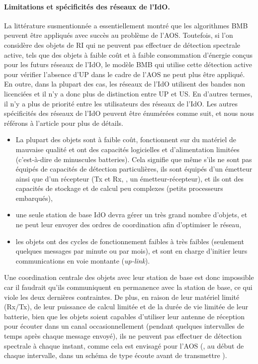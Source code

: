 \begin{resume_fr}
\paragraph{Limitations et spécificités des réseaux de l'IdO.}
%
La littérature susmentionnée a essentiellement montré que les algorithmes BMB peuvent être appliqués avec succès au problème de l'AOS.
Toutefois, si l'on considère des objets de RI qui ne peuvent pas effectuer de détection spectrale active, tels que des objets à faible coût et à faible consommation d'énergie conçus pour les futurs réseaux de l'IdO, le modèle BMB qui utilise cette détection active pour vérifier l'absence d'UP dans le cadre de l'AOS ne peut plus être appliqué.
En outre, dans la plupart des cas, les réseaux de l'IdO utilisent des bandes non licenciées et il n'y a donc plus de distinction entre UP et US.
En d'autres termes, il n'y a plus de priorité entre les utilisateurs des réseaux de l'IdO.
%
Les autres spécificités des réseaux de l'IdO peuvent être énumérées comme suit,
et nous nous référons à l'article \cite{Centenaro16} pour plus de détails.
%
\begin{itemize}\tightlist
    \item
    La plupart des objets sont à faible coût, fonctionnent sur du matériel de mauvaise qualité et ont des capacités logicielles et d'alimentation limitées (c'est-à-dire de minuscules batteries).
    Cela signifie que même s'ils ne sont pas équipés de capacités de détection particulières,
    ils sont équipés d'un émetteur ainsi que d'un récepteur (Tx et Rx, \ie, un émetteur-récepteur),
    et ils ont des capacités de stockage et de calcul peu complexes (petits processeurs embarqués),
    \item
    une seule station de base IdO devra gérer un très grand nombre d'objets,
    et ne peut leur envoyer des ordres de coordination afin d'optimiser le réseau,
    \item
    les objets ont des cycles de fonctionnement faibles à très faibles (seulement quelques messages par minute ou par mois), et sont en charge d'initier leurs communications en voie montante (\emph{up-link}).
\end{itemize}

Une coordination centrale des objets avec leur station de base est donc impossible car il faudrait qu'ils communiquent en permanence avec la station de base, ce qui viole les deux dernières contraintes.
%
De plus, en raison de leur matériel limité (Rx/Tx), de leur puissance de calcul limitée et de la durée de vie limitée de leur batterie, bien que les objets soient capables d'utiliser leur antenne de réception pour écouter dans un canal occasionnellement (pendant quelques intervalles de temps après chaque message envoyé), ils ne peuvent pas effectuer de détection spectrale à chaque instant, comme cela est envisagé pour l'AOS (\ie, au début de chaque intervalle, dans un schéma de type \guillemotleft{} écoute avant de transmettre \guillemotright{}).


\end{resume_fr}
